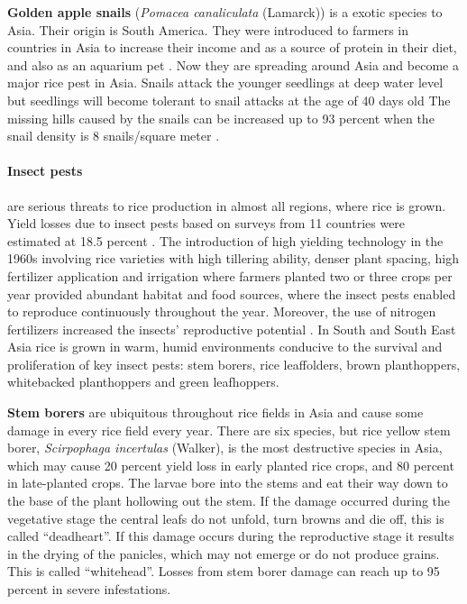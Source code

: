 \documentclass[12pt, oneside]{report}
\begin{document}
\textbf{Golden apple snails} (\textit{Pomacea canaliculata} (Lamarck)) is a exotic species to Asia. Their origin is South America. They were introduced to farmers in countries in Asia to increase their income and as a source of protein in their diet, and also as an aquarium pet \citep{joshi2007problems}. Now they are spreading around Asia and become a major rice pest in Asia. Snails attack the younger seedlings at deep water level but seedlings will become tolerant to snail attacks at the age of 40 days old \citep{sin2003damage} The missing hills caused by the snails can be increased up to 93 percent when the snail density is 8 snails/square meter \citep{basilio1991problems}.

\paragraph{Insect pests} are serious threats to rice production in almost all regions, where rice is grown. Yield losses due to insect pests based on surveys from 11 countries were estimated at 18.5 percent \citep{pathak1994insect}. The introduction of high yielding technology in the 1960s involving rice varieties with high tillering ability, denser plant spacing, high fertilizer application and irrigation where farmers planted two or three crops per year provided abundant habitat and food sources, where the insect pests enabled to reproduce continuously throughout the year. Moreover, the use of nitrogen fertilizers increased the insects' reproductive potential \citep{bottrell2012resurrecting}. In South and South East Asia rice is grown in warm, humid environments conducive to the survival and proliferation of key insect pests: stem borers, rice leaffolders, brown planthoppers, whitebacked planthoppers and green leafhoppers.

\textbf{Stem borers} are ubiquitous throughout rice fields in Asia and cause some damage in every rice field every year. There are six species, but rice yellow stem borer, \textit{Scirpophaga incertulas} (Walker), is the most destructive species in Asia, which may cause 20 percent yield loss in early planted rice crops, and 80 percent in late-planted crops. The larvae bore into the stems and eat their way down to the base of the plant hollowing out the stem. If the damage occurred during the vegetative stage the central leafs do not unfold, turn browns and die off, this is called ``deadheart''. If this damage occurs during the reproductive stage it results in the drying of the panicles, which may not emerge or do not produce grains. This is called ``whitehead''. Losses from stem borer damage can reach up to 95 percent in severe infestations. 
\end{document}
